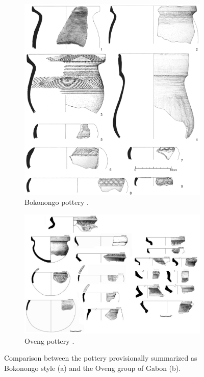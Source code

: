 \begin{reviewer}
\begin{figure}[!tb]
	\begin{subfigure}[t]{.38\textwidth}
		\includegraphics[width=\textwidth]{fig/BOG-Typen.jpg}
		\caption{Bokonongo pottery \citep[122 Fig.~50]{Seidensticker.2021e}.}
	\end{subfigure}\hspace{.5em}\hfill
	\begin{subfigure}[t]{.61\textwidth}
		\includegraphics[width=\textwidth]{fig/GonzalesRuibal2012_134Fig15_Oveng-Trad.jpg}
		\caption{Oveng pottery \citep[134 Fig.~15]{GonzalesRuibal.2012}.}
	\end{subfigure}
	\caption{Comparison between the pottery provisionally summarized as Bokonongo style (a) and the Oveng group of Gabon (b).}
	\label{fig:vgl_bog_oveng}
\end{figure}


\end{reviewer}
